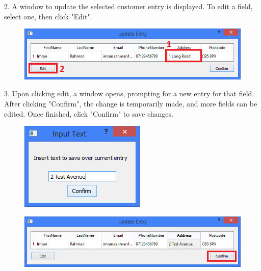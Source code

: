 2. A window to update the selected customer entry is displayed. To edit a field, select one, then click "Edit".

\begin{figure}[H]
    \includegraphics[width=\textwidth]{./Manual/Tutorial/Q2/EditField.png}
\end{figure}

3. Upon clicking edit, a window opens, prompting for a new entry for that field. After clicking "Confirm", the change is temporarily made, and more fields can be edited. Once finished, click "Confirm" to save changes. 

\begin{figure}[H]
    \includegraphics[width=\textwidth]{./Manual/Tutorial/Q2/InputText.png}
\end{figure}

\begin{figure}[H]
    \includegraphics[width=\textwidth]{./Manual/Tutorial/Q2/Confirm.png}
\end{figure}

